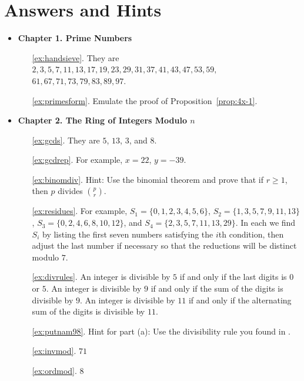 \chapter*{Answers and Hints}
\newcommand{\chapitem}[2]{\vspace{2ex}\item {\large \bf #1. #2}}
\begin{itemize}
\chapitem{Chapter 1}{Prime Numbers}
\begin{enumerate}
\item[\ref{ex:handsieve}.] They are
$2, 3, 5, 7, 11, 13, 17, 19, 23, 29, 31, 37, 41, 43, 47, 53, 59,$\\
$61, 67, 71, 73, 79, 83, 89, 97$.
\item[\ref{ex:primesform}.] Emulate the proof of Proposition~\ref{prop:4x-1}.
\end{enumerate}

\chapitem{Chapter 2}{The Ring of Integers Modulo $n$}
\begin{enumerate}
\item[\ref{ex:gcds}.] They are $5$, $13$, $3$, and $8$.
\item[\ref{ex:gcdrep}.] For example, $x=22$, $y=-39$.

\item[\ref{ex:binomdiv}.] Hint: Use the binomial theorem
and prove that if $r\geq 1$, then $p$ divides
$\binom{p}{r}$.

\item[\ref{ex:residues}.] For example,
$S_1 = \{0,1,2,3,4,5,6\}$, $S_2 = \{1,3,5,7,9,11,13\}$,
$S_3 = \{0,2,4,6,8,10,12\}$, and $S_4 = \{2,3,5,7,11,13,29\}.$
In each we find $S_i$ by listing the first seven numbers
satisfying the $i$th condition, then adjust the last number if
necessary so that the reductions will be distinct modulo $7$.
\item[\ref{ex:divrules}.] An integer is divisible by $5$ if
and only if the last digits is $0$ or $5$.  An integer is
divisible by $9$ if and only if the sum of the digits is
divisible by $9$.  An integer is divisible by $11$ if and only
if the alternating sum of the digits is divisible by $11$.
\item[\ref{ex:putnam98}.] Hint for part (a): Use the divisibility rule
you found in .

\item[\ref{ex:invmod}.] $71$

\item[\ref{ex:ordmod}.] $8$


\end{enumerate}
\end{itemize}
